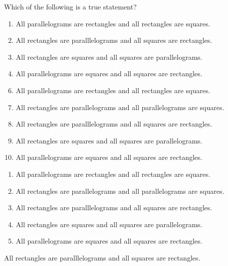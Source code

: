 




  Which of the following is a true statement?



\ifsat
	\begin{enumerate}[label=\Alph*)]
		\item    All parallelograms are rectangles and all rectangles are squares.
		\item   All rectangles are paralllelograms and all squares are rectangles.%
		\item  All rectangles are squares and all squares are parallelograms.
		\item  All parallelograms are squares and all squares are rectangles.
	\end{enumerate}
\else
\fi

\ifacteven
	\begin{enumerate}[label=\textbf{\Alph*.},itemsep=\fill,align=left]
		\setcounter{enumii}{5}
		\item    All parallelograms are rectangles and all rectangles are squares.
		\item   All rectangles are parallelograms and all parallelograms are squares.
		\item   All rectangles are paralllelograms and all squares are rectangles.%
		\addtocounter{enumii}{1}
		\item  All rectangles are squares and all squares are parallelograms.
		\item  All parallelograms are squares and all squares are rectangles.
	\end{enumerate}
\else
\fi

\ifactodd
	\begin{enumerate}[label=\textbf{\Alph*.},itemsep=\fill,align=left]
		\item    All parallelograms are rectangles and all rectangles are squares.
		\item   All rectangles are parallelograms and all parallelograms are squares.
		\item   All rectangles are paralllelograms and all squares are rectangles.%
		\item  All rectangles are squares and all squares are parallelograms.
		\item  All parallelograms are squares and all squares are rectangles.
	\end{enumerate}
\else
\fi

\ifgridin
   All rectangles are paralllelograms and all squares are rectangles.%
		
\else
\fi

